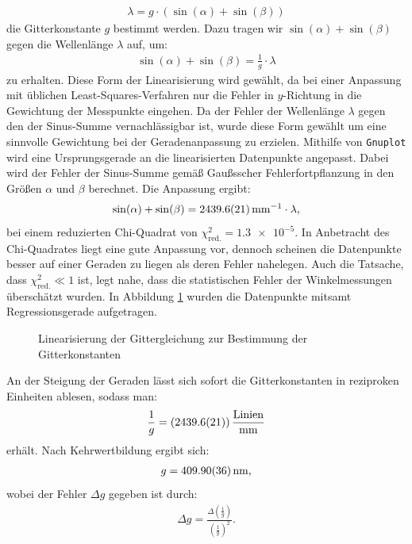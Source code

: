 \documentclass[11pt, a4paper]{article}
\numberwithin{equation}{section}
\begin{document}
\begin{align*}
	\lambda = g \cdot (\sin(\alpha) + \sin(\beta))
\end{align*}
die Gitterkonstante $g$ bestimmt werden.
Dazu tragen wir $\sin(\alpha) + \sin(\beta)$ gegen die Wellenlänge $\lambda$ auf, um:
\begin{align*}
\sin(\alpha) + \sin(\beta) = \frac{1}{g} \cdot \lambda
\end{align*}
zu erhalten.
Diese Form der Linearisierung wird gewählt, da bei einer Anpassung mit üblichen Least-Squares-Verfahren nur die Fehler in $y$-Richtung in die Gewichtung der Messpunkte eingehen.
Da der Fehler der Wellenlänge $\lambda$ gegen den der Sinus-Summe vernachlässigbar ist, wurde diese Form gewählt um eine sinnvolle Gewichtung bei der Geradenanpassung zu erzielen.
Mithilfe von \texttt{Gnuplot} wird eine Ursprungsgerade an die linearisierten Datenpunkte angepasst.
Dabei wird der Fehler der Sinus-Summe gemäß Gaußsscher Fehlerfortpflanzung in den Größen $\alpha$ und $\beta$ berechnet.
Die Anpassung ergibt:
\begin{align*}
	\sin(\alpha) + \sin(\beta) = \SI{2439.6 +- 2.1}{\per\milli\metre} \cdot \lambda \text{,}
\end{align*}
bei einem reduzierten Chi-Quadrat von $\chi_\mathrm{red.}^2 = \num{1.3e-5}$.
In Anbetracht des Chi-Quadrates liegt eine gute Anpassung vor, dennoch scheinen die Datenpunkte besser auf einer Geraden zu liegen als deren Fehler nahelegen.
Auch die Tatsache, dass $\chi_\mathrm{red.}^2 \ll 1$ ist, legt nahe, dass die statistischen Fehler der Winkelmessungen überschätzt wurden.
In Abbildung \ref{fig:gitterkonstante} wurden die Datenpunkte mitsamt Regressionsgerade aufgetragen.
\begin{figure}[h]
	\centering
	
	\caption{Linearisierung der Gittergleichung zur Bestimmung der Gitterkonstanten}
	\label{fig:gitterkonstante}
\end{figure}
An der Steigung der Geraden lässt sich sofort die Gitterkonstanten in reziproken Einheiten ablesen, sodass man:
\begin{align*}
	\frac{1}{g} = (\num{2439.6 +- 2.1}) \, \frac{\mathrm{Linien}}{\si{\milli\metre}}
\end{align*}
erhält. Nach Kehrwertbildung ergibt sich:
\begin{align*}
	g = \SI{409.90 +- 0.36}{\nano\metre} \text{,}
\end{align*}
wobei der Fehler $\Delta g$ gegeben ist durch:
\begin{align*}
	\Delta g = \frac{\Delta \left( \frac{1}{g} \right)}{\left( \frac{1}{g} \right)^2} \text{.}
\end{align*}
\end{document}

